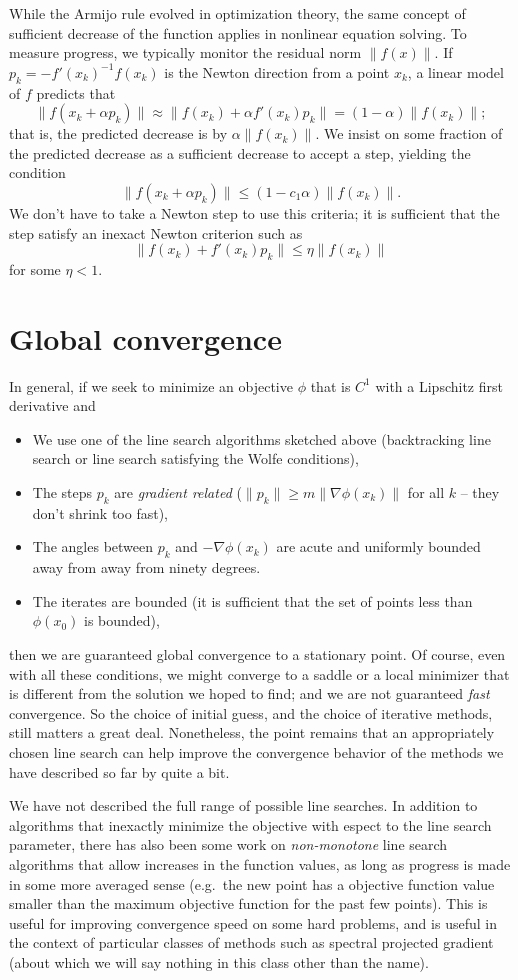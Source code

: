 \documentclass[12pt, leqno]{article} %
\begin{document}
While the Armijo rule evolved in optimization theory, the same concept
of sufficient decrease of the function applies in nonlinear equation
solving.  To measure progress, we typically monitor the residual norm
$\|f(x)\|$.  If $p_k = -f'(x_k)^{-1} f(x_k)$ is the Newton direction
from a point $x_k$, a linear model of $f$ predicts that
\[
  \|f(x_k + \alpha p_k)\| \approx
  \|f(x_k) + \alpha f'(x_k) p_k\| =
  (1-\alpha) \|f(x_k)\|;
\]
that is, the predicted decrease is by $\alpha \|f(x_k)\|$.
We insist on some fraction of the predicted decrease as a
sufficient decrease to accept a step, yielding the condition
\[
  \|f(x_k + \alpha p_k)\| \leq (1-c_1 \alpha) \|f(x_k)\|.
\]
We don't have to take a Newton step to use this criteria; it
is sufficient that the step satisfy an inexact Newton criterion
such as
\[
  \|f(x_k) + f'(x_k) p_k\| \leq \eta \|f(x_k)\|
\]
for some $\eta < 1$.

\section{Global convergence}

In general, if we seek to minimize an objective $\phi$ that is $C^1$ with
a Lipschitz first derivative and
\begin{itemize}
\item We use one of the line search algorithms sketched above
  (backtracking line search or line search satisfying the Wolfe
  conditions),
\item The steps $p_k$ are {\em gradient related} ($\|p_k\| \geq m
  \|\nabla \phi(x_k)\|$ for all $k$ -- they don't shrink too fast),
\item The angles between $p_k$ and $-\nabla \phi(x_k)$ are acute
  and uniformly bounded away from away from ninety degrees.
\item The iterates are bounded (it is sufficient that the set of
  points less than $\phi(x_0)$ is bounded),
\end{itemize}
then we are guaranteed global convergence to a stationary point.  Of
course, even with all these conditions, we might converge to a saddle
or a local minimizer that is different from the solution we hoped to
find; and we are not guaranteed {\em fast} convergence.  So the choice
of initial guess, and the choice of iterative methods, still matters
a great deal.  Nonetheless, the point remains that an appropriately
chosen line search can help improve the convergence behavior of the
methods we have described so far by quite a bit.

We have not described the full range of possible line searches.
In addition to algorithms that inexactly minimize the objective
with espect to the line search parameter,
there has also been some work on {\em non-monotone} line search
algorithms that allow increases in the function values, as long as
progress is made in some more averaged sense (e.g.~the new point
has a objective function value smaller than the maximum objective
function for the past few points).  This is useful for improving
convergence speed on some hard problems, and is useful in the context
of particular classes of methods such as spectral projected gradient
(about which we will say nothing in this class other than the name).
\end{document}

